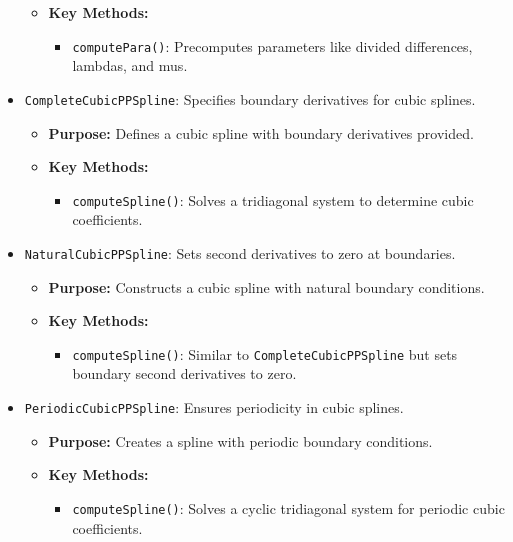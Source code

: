 \documentclass[a4paper]{article}
\begin{document}
\begin{itemize}
\begin{itemize}
        \item \textbf{Key Methods:}
            \begin{itemize}
                \item \texttt{computePara()}: Precomputes parameters like divided differences, lambdas, and mus.
            \end{itemize}
    \end{itemize}
    \item \texttt{CompleteCubicPPSpline}: Specifies boundary derivatives for cubic splines.
    \begin{itemize}
        \item \textbf{Purpose:} Defines a cubic spline with boundary derivatives provided.
        \item \textbf{Key Methods:}
            \begin{itemize}
                \item \texttt{computeSpline()}: Solves a tridiagonal system to determine cubic coefficients.
            \end{itemize}
    \end{itemize}
    \item \texttt{NaturalCubicPPSpline}: Sets second derivatives to zero at boundaries.
    \begin{itemize}
        \item \textbf{Purpose:} Constructs a cubic spline with natural boundary conditions.
        \item \textbf{Key Methods:}
            \begin{itemize}
                \item \texttt{computeSpline()}: Similar to \texttt{CompleteCubicPPSpline} but sets boundary second derivatives to zero.
            \end{itemize}
    \end{itemize}
    \item \texttt{PeriodicCubicPPSpline}: Ensures periodicity in cubic splines.
    \begin{itemize}
        \item \textbf{Purpose:} Creates a spline with periodic boundary conditions.
        \item \textbf{Key Methods:}
            \begin{itemize}
                \item \texttt{computeSpline()}: Solves a cyclic tridiagonal system for periodic cubic coefficients.
            \end{itemize}
    \end{itemize}
\end{itemize}
\end{document}
